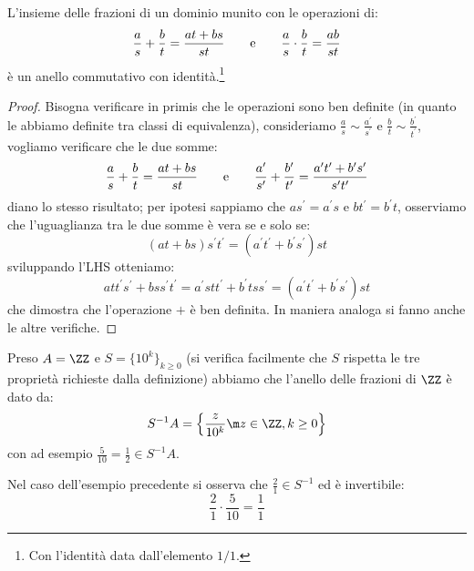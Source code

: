 \documentclass[11pt]{scrartcl}
\begin{document}
\begin{proposition}
    L'insieme delle frazioni di un dominio munito con le operazioni di:
    \[ \frac{a}{s} + \frac{b}{t} = \frac{at+bs}{st} \qquad \text e \qquad \frac{a}{s} \cdot \frac{b}{t} = \frac{ab}{st}
        \]
    è un anello commutativo con identità.\footnote{Con l'identità data dall'elemento $1/1$.}
\end{proposition}

\begin{proof}
    Bisogna verificare in primis che le operazioni sono ben definite (in quanto le abbiamo definite tra classi di equivalenza), consideriamo $\displaystyle\frac{a}{s}\sim\frac{a^{\prime}}{s^{\prime}}$ e
    $\displaystyle\frac{b}{t}\sim\frac{b^{\prime}}{t^{\prime}}$, vogliamo verificare che le due somme:
    \[ \frac{a}{s} + \frac{b}{t} = \frac{at+bs}{st} \qquad \text e \qquad \frac{a^{\prime}}{s^{\prime}} + \frac{b^{\prime}}{t^{\prime}} = \frac{a^{\prime}t^{\prime}+b^{\prime}s^{\prime}}{s^{\prime}t^{\prime}}
        \]
    diano lo stesso risultato; per ipotesi sappiamo che $as^{\prime}=a^{\prime}s$ e $bt^{\prime}=b^{\prime}t$, osserviamo che l'uguaglianza tra le due somme è vera se e solo se:
    \[ (at+bs)s^{\prime}t^{\prime} = (a^{\prime}t^{\prime}+b^{\prime}s^{\prime})st
        \]
    sviluppando l'LHS otteniamo:
    \[ att^{\prime}s^{\prime} + bss^{\prime}t^{\prime} = a^{\prime}stt^{\prime}+b^{\prime}tss^{\prime} = (a^{\prime}t^{\prime}+b^{\prime}s^{\prime})st
        \]
    che dimostra che l'operazione $+$ è ben definita. In maniera analoga si fanno anche le altre verifiche.
\end{proof}

\begin{example}
    Preso $A = \ZZ$ e $S = \{10^k\}_{k\geq 0}$ (si verifica facilmente che $S$ rispetta le tre proprietà richieste dalla definizione) abbiamo che l'anello delle frazioni di $\ZZ$ è dato da:
    \[ S^{-1}A = \left\{\frac{z}{10^k} \m z \in \ZZ, k \geq 0\right\}
        \]
    con ad esempio $\displaystyle \frac{5}{10} = \frac{1}{2} \in S^{-1}A$.
\end{example}

\begin{remark}
    Nel caso dell'esempio precedente si osserva che $\displaystyle\frac{2}{1} \in S^{-1}$ ed è invertibile:
        \[\frac{2}{1} \cdot \frac{5}{10} = \frac{1}{1}
            \]
\end{remark}
\end{document}
